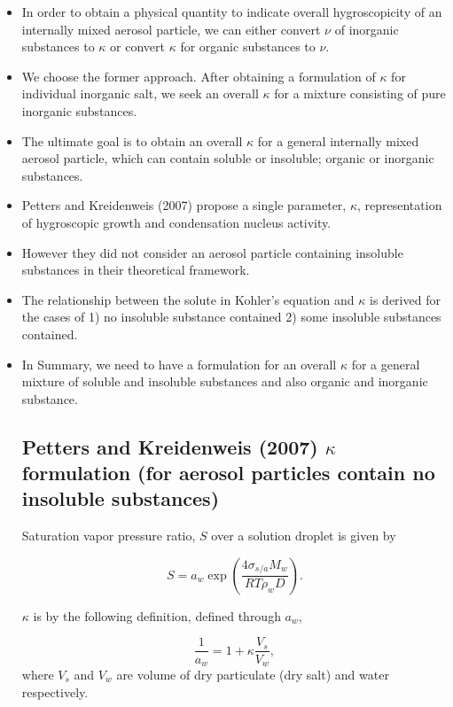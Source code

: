 \documentclass[12pt]{article}
\begin{document}
\begin{itemize}
\item In order to obtain a physical quantity to indicate overall hygroscopicity of an internally mixed aerosol particle, we can either convert $\nu$ of inorganic substances to $\kappa$ or convert $\kappa$ for organic substances to $\nu$. 


\item We choose the former approach. After obtaining a formulation of $\kappa$ for individual inorganic salt, we seek an overall $\kappa$ for a mixture consisting of pure inorganic substances. 

\item The ultimate goal is to obtain an overall $\kappa$ for a general internally mixed aerosol particle, which can contain soluble or insoluble; organic or inorganic substances.

\item Petters and Kreidenweis (2007) propose a single parameter, $\kappa$, representation of hygroscopic growth and condensation nucleus activity.

\item However they did not consider an aerosol particle containing insoluble substances in their theoretical framework.

\item The relationship between the solute in Kohler's equation and $\kappa$ is derived for the cases of 1) no insoluble substance contained 2) some insoluble substances contained.  

\item In Summary, we need to have a formulation for an overall $\kappa$ for a general mixture of soluble and insoluble substances and also organic and inorganic substance. 
 
\subsection{Petters and Kreidenweis (2007) $\kappa$ formulation (for aerosol particles contain no insoluble substances)}

Saturation vapor pressure ratio, $S$ over a solution droplet is given by 

\begin{equation}\label{eqn:83}
S=a_w \exp (\frac{4 \sigma_{s/a} M_{w}} {RT\rho_wD}). 
\end{equation}

$\kappa$ is by the following definition, defined through $a_w$,

\begin{equation}\label{eqn:84}
\frac{1}{a_w}=1+\kappa \frac{V_s}{V_w},
\end{equation}  
where $ V_s$ and $ V_w$ are volume of dry particulate (dry salt) and water respectively.


\end{itemize}
\end{document}
